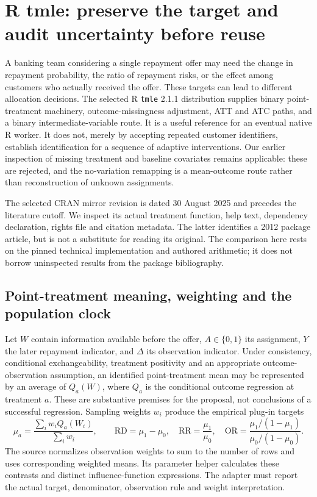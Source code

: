 \section{R tmle: preserve the target and audit uncertainty before reuse}
\label{sec:exec24-tmle-reuse}

A banking team considering a single repayment offer may need the change in
repayment probability, the ratio of repayment risks, or the effect among
customers who actually received the offer. These targets can lead to different
allocation decisions. The selected R \texttt{tmle} 2.1.1 distribution supplies
binary point-treatment machinery, outcome-missingness adjustment, ATT and ATC
paths, and a binary intermediate-variable route. It is a useful reference for
an eventual native R worker. It does not, merely by accepting repeated customer
identifiers, establish identification for a sequence of adaptive interventions.
Our earlier inspection of missing treatment and baseline covariates remains
applicable: these are rejected, and the no-variation remapping is a mean-outcome
route rather than reconstruction of unknown assignments.
\citep{exec20_rfx_tmle}

The selected CRAN mirror revision is dated 30 August 2025 and precedes the
literature cutoff. We inspect its actual treatment function, help text,
dependency declaration, rights file and citation metadata. The latter identifies
a 2012 package article, but is not a substitute for reading its original.
The comparison here rests on the pinned technical implementation and authored
arithmetic; it does not borrow uninspected results from the package bibliography.
\citep{exec24_tmle_sources}

\subsection{Point-treatment meaning, weighting and the population clock}
Let $W$ contain information available before the offer, $A\in\{0,1\}$ its
assignment, $Y$ the later repayment indicator, and $\Delta$ its observation
indicator. Under consistency, conditional exchangeability, treatment positivity
and an appropriate outcome-observation assumption, an identified point-treatment
mean may be represented by an average of $Q_a(W)$, where $Q_a$ is the conditional
outcome regression at treatment $a$. These are substantive premises for the
proposal, not conclusions of a successful regression. Sampling weights $w_i$
produce the empirical plug-in targets
\[
 \mu_a=\frac{\sum_i w_i Q_a(W_i)}{\sum_i w_i},\qquad
 \mathrm{RD}=\mu_1-\mu_0,\quad
 \mathrm{RR}=\frac{\mu_1}{\mu_0},\quad
 \mathrm{OR}=\frac{\mu_1/(1-\mu_1)}{\mu_0/(1-\mu_0)}.
\]
The source normalizes observation weights to sum to the number of rows and
uses corresponding weighted means. Its parameter helper calculates these
contrasts and distinct influence-function expressions. The adapter must report
the actual target, denominator, observation rule and weight interpretation.
\citep{exec24_tmle_sources}

